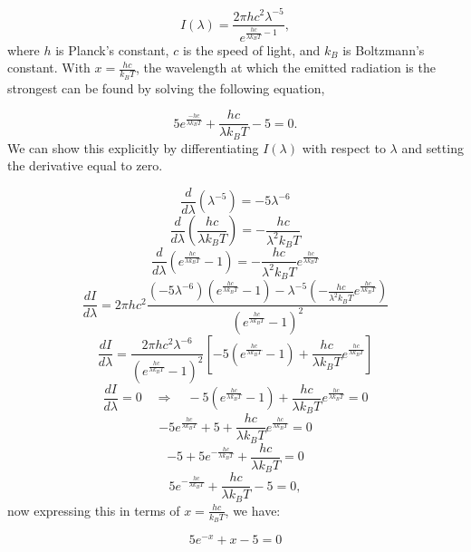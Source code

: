 \documentclass[a4paper,11pt]{article}
\begin{document}
\[ I(\lambda) = \frac{2 \pi hc^2 \lambda^{-5}}{e^{\frac{hc}{\lambda k_B T} -1}}, \] where $h$ is Planck's constant, $c$ is the speed of light, and $k_B$ is Boltzmann's constant. With $x = \frac{hc}{k_B T}$, the wavelength at which the emitted radiation is the strongest can be found by solving the following equation,

\[ 5 e^{\frac{-hc}{\lambda k_B T}} + \frac{hc}{\lambda k_B T} - 5 = 0. \] We can show this explicitly by differentiating $I(\lambda)$ with respect to $\lambda$ and setting the derivative equal to zero. 

\[ \frac{d}{d\lambda}(\lambda^{-5}) = -5\lambda^{-6}\]
\[ \frac{d}{d\lambda}\left(\frac{hc}{\lambda k_BT}\right) = -\frac{hc}{\lambda^2 k_BT} \]
\[ \frac{d}{d\lambda}\left(e^{\frac{hc}{\lambda k_BT}}-1\right) = -\frac{hc}{\lambda^2 k_BT}e^{\frac{hc}{\lambda k_BT}} \]
\[ \frac{dI}{d\lambda} = 2\pi hc^2\frac{(-5\lambda^{-6})\left(e^{\frac{hc}{\lambda k_BT}}-1\right)-\lambda^{-5}\left(-\frac{hc}{\lambda^2 k_BT}e^{\frac{hc}{\lambda k_BT}}\right)}{\left(e^{\frac{hc}{\lambda k_BT}}-1\right)^2} \]
\[ \frac{dI}{d\lambda} = \frac{2\pi hc^2\lambda^{-6}}{\left(e^{\frac{hc}{\lambda k_BT}}-1\right)^2}\left[-5\left(e^{\frac{hc}{\lambda k_BT}}-1\right)+\frac{hc}{\lambda k_BT}e^{\frac{hc}{\lambda k_BT}}\right] \]
\[ \frac{dI}{d\lambda}=0 \quad\Longrightarrow\quad -5\left(e^{\frac{hc}{\lambda k_BT}}-1\right)+\frac{hc}{\lambda k_BT}e^{\frac{hc}{\lambda k_BT}}=0 \]
\[ -5e^{\frac{hc}{\lambda k_BT}}+5+\frac{hc}{\lambda k_BT}e^{\frac{hc}{\lambda k_BT}}=0 \]
\[ -5+5e^{-\frac{hc}{\lambda k_BT}}+\frac{hc}{\lambda k_BT}=0 \]
\[ 5e^{-\frac{hc}{\lambda k_BT}}+\frac{hc}{\lambda k_BT}-5=0, \] now expressing this in terms of $x = \frac{hc}{k_BT}$, we have:

\[ \boxed{5e^{-x} + x -5=0}\]
\end{document}
